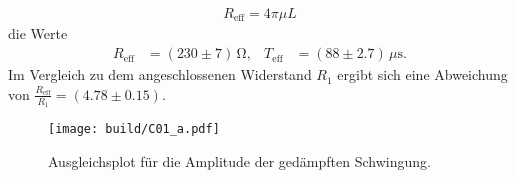 \begin{align*}
    R_\text{eff} = 4 \pi \mu L
\end{align*}
die Werte 
\begin{align}
    R_\text{eff} &= (\num[]{230} \pm \num[]{7}) \, \unit{\ohm}, & 
    T_\text{eff} &= (\num[]{88} \pm \num[]{2.7}) \, \mu \unit{\second}.
\end{align}
Im Vergleich zu dem angeschlossenen Widerstand $R_1$ ergibt sich eine
Abweichung von $\frac{R_\text{eff}}{R_1} = (\num[]{4.78} \pm \num[]{0.15})$.
\begin{figure}[H]
    \centering
    \texttt{[image: build/C01\_a.pdf]}
    \caption{Ausgleichsplot für die Amplitude der gedämpften Schwingung.}
    \label{fig:plot_amplitude}
\end{figure}

